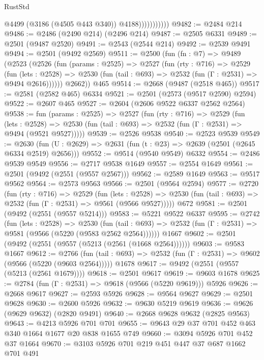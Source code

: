 \begin{lexlean}{RustStd}
\begin{coremodule}
                          @4499
                          (@3186 (@4505 @443 @340))
                          @4188)))))))))))
@9482 := @2484 @214
@9486 := @2486 (@2490 @214) (@2496 @214)
@9487 := @2505 @6331
@9489 := @2501 (@9487 @2520)
@9491 := @2543 (@2544 @214)
@9492 := @2539 @9491
@9494 := @2501 (@9492 @2569)
@9511 := @2500
    (fun (fn : @7) =>
    @9489
      (@2523
        (@2526
          (fun (params : @2525) =>
          @2527
            (fun (rty : @716) =>
            @2529
              (fun (lets : @2528) =>
              @2530 (fun (tail : @693) => @2532 (fun (Γ : @2531) => @9494 @2616))))))
        @2662))
    @465
@9514 := @2668 (@9487 (@2518 @465))
@9517 := @2581 (@2582 @465) @6334
@9521 := @2501 (@2573 (@9517 @2590) @2594)
@9522 := @2607 @465
@9527 := @2604 (@2606 @9522 @6337 @2562 @2564)
@9538 := fun (params : @2525) =>
  @2527
    (fun (rty : @716) =>
    @2529
      (fun (lets : @2528) =>
      @2530 (fun (tail : @693) => @2532 (fun (Γ : @2531) => @9494 (@9521 @9527)))))
@9539 := @2526 @9538
@9540 := @2523 @9539
@9549 := @2630 (fun (U : @2629) => @2631 (fun (t : @23) => @2639 (@2501 (@2645 @6334 @2519) @2656)))
@9552 := @9514 (@9540 @9549) @6332
@9554 := @2486 @9539 @9549
@9556 := @2717 @9538 @1649
@9557 := @2554 @1649
@9561 := @2501 (@9492 (@2551 (@9557 @2567)))
@9562 := @2589 @1649
@9563 := @9517 @9562
@9564 := @2573 @9563
@9566 := @2501 (@9564 @2594)
@9577 := @2720
    (fun (rty : @716) =>
    @2529
      (fun (lets : @2528) =>
      @2530 (fun (tail : @693) => @2532 (fun (Γ : @2531) => @9561 (@9566 @9527)))))
    @672
@9581 := @2501 (@9492 (@2551 (@9557 @5214)))
@9583 := @5221 @9522 @6337
@9595 := @2742
    (fun (lets : @2528) =>
    @2530
      (fun (tail : @693) => @2532 (fun (Γ : @2531) => @9581 (@9566 (@5220 (@9583 @2562 @2564))))))
    @1667
@9602 := @2501 (@9492 (@2551 (@9557 (@5213 (@2561 (@1668 @2564))))))
@9603 := @9583 @1667
@9612 := @2766
    (fun (tail : @693) => @2532 (fun (Γ : @2531) => @9602 (@9566 (@5220 (@9603 @2564)))))
    @1678
@9617 := @9492 (@2551 (@9557 (@5213 (@2561 @1679))))
@9618 := @2501 @9617
@9619 := @9603 @1678
@9625 := @2784 (fun (Γ : @2531) => @9618 (@9566 (@5220 @9619))) @5926
@9626 := @2668 @9617
@9627 := @2593 @5926
@9628 := @9564 @9627
@9629 := @2501 @9628
@9630 := @2600 @5926
@9632 := @9630 @5219 @9619
@9636 := @9626 (@9629 @9632) (@2820 @9491)
@9640 := @2668 @9628 @9632 (@2825 @9563)
@9643 := @4213 @5926 @701 @701
@9655 := @9643 @29 @37 @701 @452 @463 @340 @1664 @1677 @20 @838 @1655 @749
@9660 := @3094 @5926 @701 @452 @37 @1664
@9670 := @3103 @5926 @701 @219 @451 @447 @37 @687 @1662 @701 @491

\end{coremodule}
\end{lexlean}
